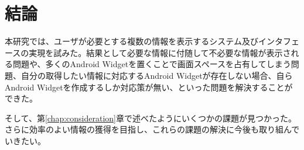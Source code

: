 \chapter{結論}
\label{chap:conclusion}

本研究では、ユーザが必要とする複数の情報を表示するシステム及びインタフェースの実現を試みた。結果として必要な情報に付随して不必要な情報が表示される問題や、多くのAndroid Widgetを置くことで画面スペースを占有してしまう問題、自分の取得したい情報に対応するAndroid Widgetが存在しない場合、自らAndroid Widgetを作成するしか対応策が無い、といった問題を解決することができた。

そして、第\ref{chap:consideration}章で述べたようにいくつかの課題が見つかった。さらに効率のよい情報の獲得を目指し、これらの課題の解決に今後も取り組んでいきたい。
